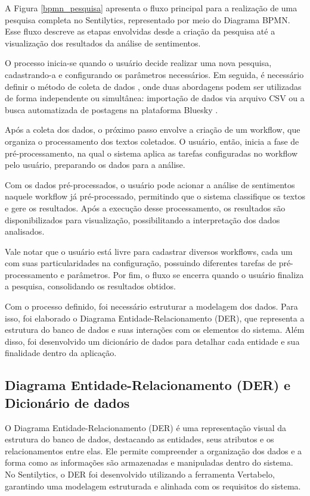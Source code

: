 \documentclass[
	12pt,				%
	oneside,			%
	a4paper,			%
	english,			%
	french,				%
	spanish,			%
	brazil				%
	]{abntex2}
\begin{document}
A Figura \ref{bpmn_pesquisa} apresenta o fluxo principal para a
realização de uma pesquisa completa no Sentilytics, representado por
meio do Diagrama BPMN. Esse fluxo descreve as etapas envolvidas desde a
criação da pesquisa até a visualização dos resultados da análise de
sentimentos.

O processo inicia-se quando o usuário decide realizar uma nova pesquisa,
cadastrando-a e configurando os parâmetros necessários. Em seguida, é
necessário definir o método de coleta de dados , onde duas abordagens
podem ser utilizadas de forma independente ou simultânea: importação de
dados via arquivo CSV ou a busca automatizada de postagens na plataforma
Bluesky .

Após a coleta dos dados, o próximo passo envolve a criação de um
workflow, que organiza o processamento dos textos coletados. O usuário,
então, inicia a fase de pré-processamento, na qual o sistema aplica as
tarefas configuradas no workflow pelo usuário, preparando os dados para
a análise.

Com os dados pré-processados, o usuário pode acionar a análise de
sentimentos naquele workflow já pré-processado, permitindo que o sistema
classifique os textos e gere os resultados. Após a execução desse
processamento, os resultados são disponibilizados para visualização,
possibilitando a interpretação dos dados analisados.

Vale notar que o usuário está livre para cadastrar diversos workflows,
cada um com suas particularidades na configuração, possuindo diferentes
tarefas de pré-processamento e parâmetros. Por fim, o fluxo se encerra
quando o usuário finaliza a pesquisa, consolidando os resultados
obtidos.

Com o processo definido, foi necessário estruturar a modelagem dos
dados. Para isso, foi elaborado o Diagrama Entidade-Relacionamento
(DER), que representa a estrutura do banco de dados e suas interações
com os elementos do sistema. Além disso, foi desenvolvido um dicionário
de dados para detalhar cada entidade e sua finalidade dentro da
aplicação.

\hypertarget{diagrama-entidade-relacionamento-der-e-dicionuxe1rio-de-dados}{%
\subsection{Diagrama Entidade-Relacionamento (DER) e Dicionário de
dados}\label{diagrama-entidade-relacionamento-der-e-dicionuxe1rio-de-dados}}

O Diagrama Entidade-Relacionamento (DER) é uma representação visual da
estrutura do banco de dados, destacando as entidades, seus atributos e
os relacionamentos entre elas. Ele permite compreender a organização dos
dados e a forma como as informações são armazenadas e manipuladas dentro
do sistema. No Sentilytics, o DER foi desenvolvido utilizando a
ferramenta Vertabelo, garantindo uma modelagem estruturada e alinhada
com os requisitos do sistema.
\end{document}
